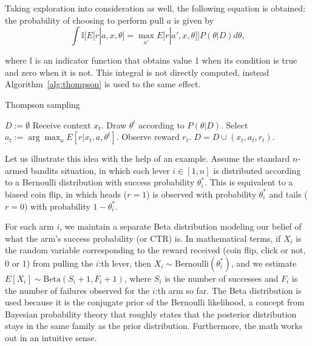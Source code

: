 \documentclass{article} %
\begin{document}
Taking exploration into consideration as well, the following equation is
obtained: the probability of choosing to perform pull $a$ is given by
\begin{equation}
  \int \mathbb{I}\bigg[E[r|a,x,\theta] = \max_{a'}
  E\big[r|a',x,\theta\big]\bigg] P(\theta | D) d\theta,
\end{equation}

where $\mathbb{I}$ is an indicator function that obtains value 1 when its
condition is true and zero when it is not.  This integral is not directly
computed, instead Algorithm~\ref{alg:thompson} is used to the same effect.

\begin{algorithm}
  \caption{Thompson sampling \cite{chapelle2011empirical}}
  \label{alg:thompson}
  \begin{algorithmic}[1]
    \State $D := \emptyset$
      \State Receive context $x_t$.
      \State Draw $\theta^t$ according to $P(\theta | D)$.
      \State Select $a_t := \arg\max_a E[r | x_t, a, \theta^t]$.
      \State Observe reward $r_t$.
      \State $D = D \cup (x_t, a_t, r_t)$.
    \EndFor
  \end{algorithmic}
\end{algorithm}

Let us illustrate this idea with the help of an example. Assume the standard
$n$-armed bandits situation, in which each lever $i \in [1,n]$ is distributed
according to a Bernoulli distribution with success probability $\theta^*_i$.
This is equivalent to a biased coin flip, in which heads ($r=1$) is observed
with probability $\theta^*_i$ and tails ($r=0$) with probability $1 -
\theta^*_i$.

For each arm $i$, we maintain a separate Beta distribution modeling our belief
of what the arm's success probability (or CTR) is. In mathematical terms, if
$X_i$ is the random variable corresponding to the reward received (coin flip,
click or not, 0 or 1) from pulling the $i$:th lever, then $X_i \sim
\text{Bernoulli}(\theta^*_i)$, and we estimate $E[X_i] \sim \text{Beta}(S_i +
1, F_i + 1)$, where $S_i$ is the number of successes and $F_i$ is the number of
failures observed for the $i$:th arm so far. The Beta distribution is used
because it is the conjugate prior of the Bernoulli likelihood, a concept from
Bayesian probability theory that roughly states that the posterior distribution
stays in the same family as the prior distribution. Furthermore, the math works
out in an intuitive sense.
\end{document}
